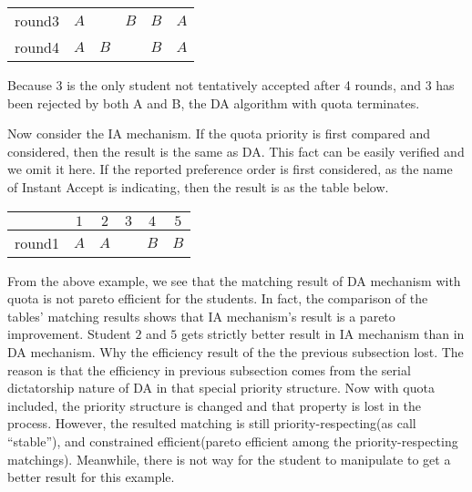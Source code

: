 \begin{example}
\begin{center}
\begin{tabular}{|c|c|c|c|c|c|}
    round3&$A$ &   & $B$ & $B$ &  $A$\\

    round4&$A$ & $B$ &  & $B$ &  $A$ \\
    \hline
    
  \end{tabular}
\end{center}

Because 3 is the only student not tentatively accepted after 4 rounds,
and 3 has been rejected by both A and B, the DA algorithm with quota
terminates.

Now consider the IA mechanism. If the quota priority is first compared
and considered, then the result is the same as DA. This fact can be
easily verified and we omit it here.  If the reported preference
order is first considered, as the name of Instant Accept is
indicating, then the result is as the table below.

\begin{center}
      \begin{tabular}{|c|c|c|c|c|c|}
        \hline
        &$1$ & $2$ & $3$ & $4$ & $5$\\
        \hline
       round1& $A$ & $A$ &  & $B$ & $B$ \\
        
        \hline
        
      \end{tabular}
    \end{center}

\end{example}

From the above example, we see that the matching result of DA mechanism with quota is not pareto efficient for the students. In fact, the comparison of the tables' 
matching results shows that IA 
mechanism's result is a pareto improvement. Student $2$ and $5$ gets strictly better result in IA mechanism than in DA mechanism. Why the efficiency result of the
the previous subsection lost. The reason is that the efficiency in previous subsection comes from the serial dictatorship nature of DA in that special priority
 structure. Now with quota included, the priority structure is changed and that property is lost in the process. However, the resulted matching is still priority-respecting(as \parencite{Svensson2014} call ``stable''), and constrained efficient(pareto efficient among the priority-respecting matchings). Meanwhile, there is not way for the student to manipulate to get a better result for this example. 

